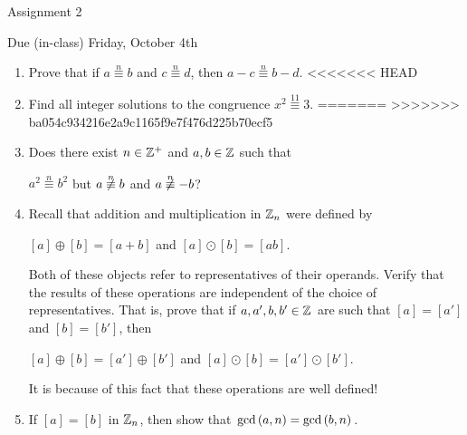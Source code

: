 \documentclass[11pt,fleqn,dvipsnames,usenames]{article}
\renewcommand{\headrulewidth}{1pt}
\newcommand{\p}{\noindent}
\begin{document}
\fancyhead[L]{\course}
\fancyhead[R]{\term}
\renewcommand{\headrulewidth}{0.4pt}

\begin{center}
{\huge Assignment 2}
\vsp

{\large Due (in-class) Friday, October 4th}
\end{center}

\begin{enumerate}
\item Prove that if $a\overset{n}{\equiv}b$ and $c\overset{n}{\equiv}d$, then $a-c\overset{n}{\equiv}b-d$.
<<<<<<< HEAD
\item Find all integer solutions to the congruence $x^2\overset{11}{\equiv}3$.
=======
>>>>>>> ba054c934216e2a9c1165f9e7f476d225b70ecf5
\item Does there exist $n\in\mathbb{Z}^{+}$ and $a,b\in\mathbb{Z}$ such that
\begin{center}
$a^2\overset{n}{\equiv}b^2$ but $a\not\overset{n}{\equiv}b$ and $a\not\overset{n}{\equiv}-b$?
\end{center}
\item Recall that addition and multiplication in $\mathbb{Z}_n$ were defined by
\begin{center}
$[a] \oplus [b] = [a + b]$ and $[a]\odot [b] = [ab]$.
\end{center}
\p Both of these objects refer to representatives of their operands.  Verify that the results of these operations are independent of the choice of representatives.  That is, prove that if $a,a',b,b'\in\mathbb{Z}$ are such that $[a] = [a']$ and $[b] = [b']$, then
\begin{center}
$[a]\oplus [b] = [a']\oplus [b']$ and $[a]\odot [b] = [a']\odot [b']$.
\end{center}

\note It is because of this fact that these operations are well defined!
\item If $[a] = [b]$ in $\mathbb{Z}_{n}$, then show that $\text{gcd}\left(a,n\right) = \text{gcd}\left(b,n\right)$.


\end{enumerate}
\end{document}
